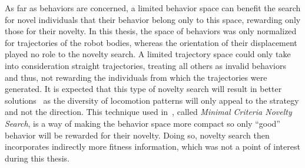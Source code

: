As far as behaviors are concerned, a limited behavior space can benefit the search for novel individuals that their behavior belong only to this space, rewarding only those for their novelty. In this thesis, the space of behaviors was only normalized for trajectories of the robot bodies, whereas the orientation of their displacement played no role to the novelty search. A limited trajectory space could only take into consideration straight trajectories, treating all others as invalid behaviors and thus, not rewarding the individuals from which the trajectories were generated. It is expected that this type of novelty search will result in better solutions~\citep{lehman2011abandoning} as the diversity of locomotion patterns will only appeal to the strategy and not the direction. This technique used in~\citep{lehman2011abandoning}, called \emph{Minimal Criteria Novelty Search}, is a way of making the behavior space more compact so only ``good'' behavior will be rewarded for their novelty. Doing so, novelty search then incorporates indirectly more fitness information, which was not a point of interest during this thesis.